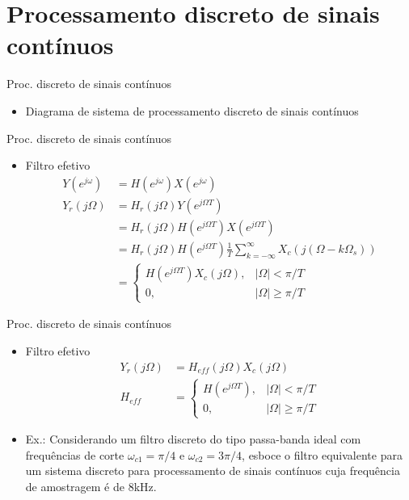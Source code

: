 \section{Processamento discreto de sinais contínuos}
\begin{slide}{Proc. discreto de sinais cont\'inuos}
\begin{itemize}
   \item Diagrama de sistema de processamento discreto de sinais cont\'inuos
   \begin{figure}
      \centering
   \end{figure}
\end{itemize}
\end{slide}

\begin{slide}{Proc. discreto de sinais cont\'inuos}
\begin{itemize}
   \item Filtro efetivo
   \begin{align}
      Y(e^{j\omega}) &= H(e^{j\omega}) X(e^{j\omega})\\
      Y_r(j\Omega)   &= H_r(j\Omega)Y(e^{j\Omega T})\\
                     &= H_r(j\Omega)H(e^{j\Omega T}) X(e^{j\Omega T})\\
                     &= H_r(j\Omega)H(e^{j\Omega T})\frac{1}{T}\sum_{k=-\infty}^{\infty}X_c(j(\Omega-k\Omega_s))\\
                     &= \begin{cases} H(e^{j\Omega T}) X_c(j\Omega), & |\Omega|<\pi /T \\
                                      0,                             & |\Omega|\geq\pi /T
                        \end{cases}
   \end{align}
\end{itemize}
\end{slide}

\begin{slide}{Proc. discreto de sinais cont\'inuos}
\begin{itemize}
   \item Filtro efetivo
   \begin{align}
      Y_r(j\Omega)   &= H_{eff}(j\Omega)X_c(j\Omega)\\
      H_{eff}        &= \begin{cases} H(e^{j\Omega T}), & |\Omega|<\pi /T \\
                                      0,                & |\Omega|\geq\pi /T
                        \end{cases}
   \end{align}
   \item Ex.: Considerando um filtro discreto do tipo passa-banda ideal com frequ\^encias de corte $\omega_{c1}=\pi/4$ e $\omega_{c2}=3\pi/4$, esboce o filtro equivalente para um sistema discreto para processamento de sinais cont\'inuos cuja frequ\^encia de amostragem \'e de $8$kHz. 
\end{itemize}
\end{slide}

